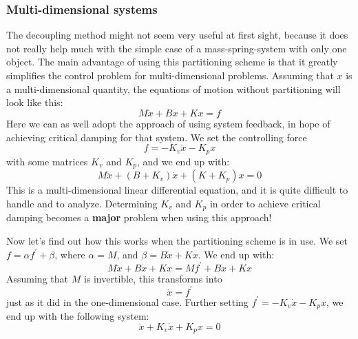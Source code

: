 \subsubsection{Multi-dimensional systems}

The decoupling method might not seem very useful at first sight, because it does not really help much with the simple case of a mass-spring-system with only one object. The main advantage of using this partitioning scheme is that it greatly simplifies the control problem for multi-dimensional problems. Assuming that $x$ is a multi-dimensional quantity, the equations of motion without partitioning will look like this:
$$
M \ddot{x}+B \dot{x}+K x=f
$$
Here we can as well adopt the approach of using system feedback, in hope of achieving critical damping for that system. We set the controlling force
$$
f=-K_{v} \dot{x}-K_{p} x
$$
with some matrices $K_{v}$ and $K_{p}$, and we end up with:
$$
M \ddot{x}+\left(B+K_{v}\right) \dot{x}+\left(K+K_{p}\right) x=0
$$
This is a multi-dimensional linear differential equation, and it is quite difficult to handle and to analyze. Determining $K_{v}$ and $K_{p}$ in order to achieve critical damping becomes a \textbf{major} problem when using this approach!

Now let's find out how this works when the partitioning scheme is in use. We set $f=\alpha f^{\prime}+\beta$, where $\alpha=M$, and $\beta=B \dot{x}+K x$. We end up with:
$$
M \ddot{x}+B \dot{x}+K x=M f^{\prime}+B \dot{x}+K x
$$
Assuming that $M$ is invertible, this transforms into
$$
\ddot{x}=f^{\prime}
$$
just as it did in the one-dimensional case. Further setting $f^{\prime}=-K_{v} \dot{x}-K_{p} x$, we end up with the following system:
$$
\ddot{x}+K_{v} \dot{x}+K_{p} x=0
$$

